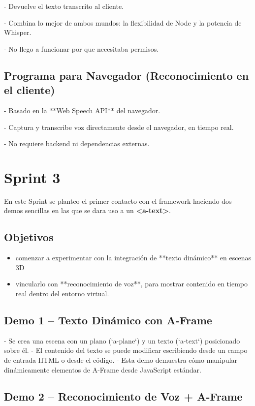 \documentclass[a4paper, 12pt]{book}
\begin{document}
- Devuelve el texto transcrito al cliente.

- Combina lo mejor de ambos mundos: la flexibilidad de Node y la potencia de Whisper.

- No llego a funcionar por que necesitaba permisos.

\subsection{Programa para Navegador (Reconocimiento en el cliente)}

- Basado en la **Web Speech API** del navegador.

- Captura y transcribe voz directamente desde el navegador, en tiempo real.

- No requiere backend ni dependencias externas.


\section{Sprint 3} 
\label{sec:sprint3}

En este Sprint se planteo el primer contacto con el framework haciendo dos demos sencillas en las que se dara uso a un \textbf{<a-text>}.
\subsection{Objetivos}
\begin{itemize}
    \item comenzar a experimentar con la integración de **texto dinámico** en escenas 3D
    \item vincularlo con **reconocimiento de voz**, para mostrar contenido en tiempo real dentro del entorno virtual.
\end{itemize}

\subsection{Demo 1 – Texto Dinámico con A-Frame} 

- Se crea una escena con un plano (`a-plane`) y un texto (`a-text`) posicionado sobre él.
- El contenido del texto se puede modificar escribiendo desde un campo de entrada HTML o desde el código.
- Esta demo demuestra cómo manipular dinámicamente elementos de A-Frame desde JavaScript estándar.
  


\subsection{Demo 2 – Reconocimiento de Voz + A-Frame}
\end{document}

